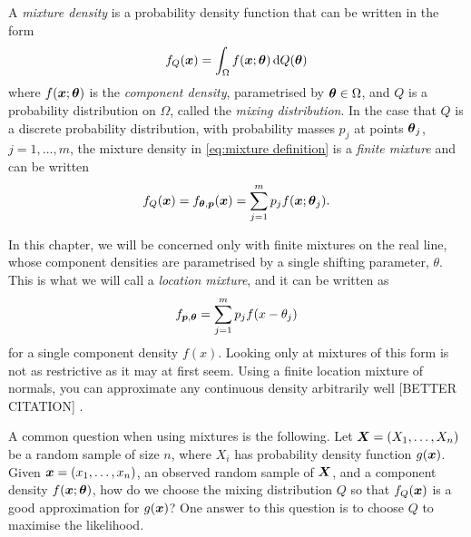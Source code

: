 
	A \emph{mixture density} is a probability density function that can be written in the form
	\begin{equation}
		f_Q({\bm{{x}}}) = \int_\Omega f({\bm{{x}}}; {\bm{{\theta}}}) \, \mathrm{d} Q({\bm{{\theta}}})
		\label{eq:mixture definition}
	\end{equation}
	where $f({\bm{{x}}};{\bm{{\theta}}})$ is the \emph{component density}, parametrised by ${\bm{{\theta}}} \in \Omega$, and $Q$ is a probability distribution on $\Omega$, called the \emph{mixing distribution}. In the case that $Q$ is a discrete probability distribution, with probability masses $p_j$ at points ${\bm{{\theta}}}_j$, $j = 1, \dots, m$, the mixture density in \eqref{eq:mixture definition} is a \emph{finite mixture} and can be written
	\begin{equation}
		f_Q({\bm{{x}}}) = f_{{\bm{{\theta}}}, {\bm{{p}}}}({\bm{{x}}}) = \sum_{j = 1}^m p_j f({\bm{{x}}}; {\bm{{\theta}}}_j).
	\end{equation}

	In this chapter, we will be concerned only with finite mixtures on the real line, whose component densities are parametrised by a single shifting parameter, $\theta$. This is what we will call a \emph{location mixture}, and it can be written as
	\begin{equation}
		f_{{\bm{{p}}}, {\bm{{\theta}}}} = \sum_{j = 1}^m p_j f(x - \theta_j)
		\label{eq:location mixture}
	\end{equation}
	for a single component density $f(x)$.
	Looking only at mixtures of this form is not as restrictive as it may at first seem. Using a finite location mixture of normals, you can approximate any continuous density arbitrarily well [BETTER CITATION] \cite{McLachlan2004-ik}.

	A common question when using mixtures is the following. Let ${\bm{{X}}} = (X_1, \dots, X_n)$ be a random sample of size $n$, where $X_i$ has probability density function $g({\bm{{x}}})$. Given ${\bm{{x}}} = (x_1, \dots, x_n)$, an observed random sample of ${\bm{{X}}}$, and a component density $f({\bm{{x}}}; {\bm{{\theta}}})$, how do we choose the mixing distribution $Q$ so that $f_Q({\bm{{x}}})$ is a good approximation for $g({\bm{{x}}})$?	One answer to this question is to choose $Q$ to maximise the likelihood.

